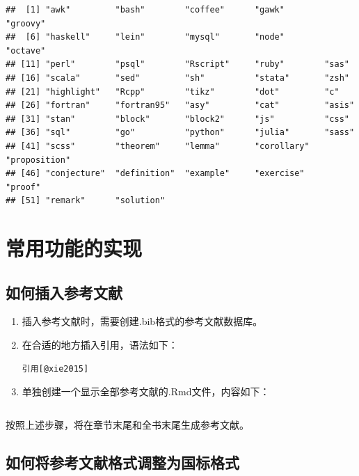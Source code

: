 \documentclass[]{ctexbook}
\begin{document}
\begin{verbatim}
##  [1] "awk"         "bash"        "coffee"      "gawk"        "groovy"     
##  [6] "haskell"     "lein"        "mysql"       "node"        "octave"     
## [11] "perl"        "psql"        "Rscript"     "ruby"        "sas"        
## [16] "scala"       "sed"         "sh"          "stata"       "zsh"        
## [21] "highlight"   "Rcpp"        "tikz"        "dot"         "c"          
## [26] "fortran"     "fortran95"   "asy"         "cat"         "asis"       
## [31] "stan"        "block"       "block2"      "js"          "css"        
## [36] "sql"         "go"          "python"      "julia"       "sass"       
## [41] "scss"        "theorem"     "lemma"       "corollary"   "proposition"
## [46] "conjecture"  "definition"  "example"     "exercise"    "proof"      
## [51] "remark"      "solution"
\end{verbatim}

\hypertarget{howtodo}{%
\chapter{常用功能的实现}\label{howtodo}}

\hypertarget{ux5982ux4f55ux63d2ux5165ux53c2ux8003ux6587ux732e}{%
\section{如何插入参考文献}\label{ux5982ux4f55ux63d2ux5165ux53c2ux8003ux6587ux732e}}

\begin{enumerate}
\def\labelenumi{\arabic{enumi}.}
\item
  插入参考文献时，需要创建.bib格式的参考文献数据库。
\item
  在合适的地方插入引用\citep{xie2015}，语法\citep{毛向樱2018}如下：

\begin{verbatim}
引用[@xie2015]
\end{verbatim}
\item
  单独创建一个显示全部参考文献的.Rmd文件，内容如下：

\begin{verbatim}
\end{verbatim}
\end{enumerate}

按照上述步骤，将在章节末尾和全书末尾生成参考文献。

\hypertarget{ux5982ux4f55ux5c06ux53c2ux8003ux6587ux732eux683cux5f0fux8c03ux6574ux4e3aux56fdux6807ux683cux5f0f}{%
\section{如何将参考文献格式调整为国标格式}\label{ux5982ux4f55ux5c06ux53c2ux8003ux6587ux732eux683cux5f0fux8c03ux6574ux4e3aux56fdux6807ux683cux5f0f}}
\end{document}
